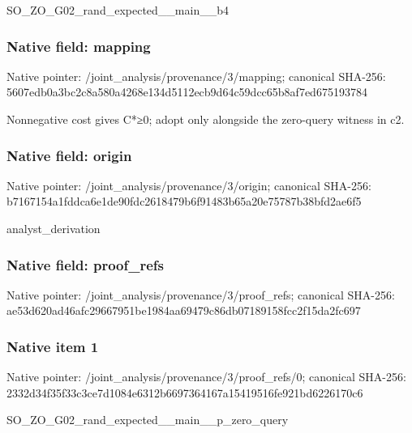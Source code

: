 \documentclass[10pt,a4paper]{article}
\begin{document}
\begingroup\raggedright\sloppy SO\_\allowbreak{}ZO\_\allowbreak{}G02\_\allowbreak{}rand\_\allowbreak{}expected\_\allowbreak{}\_\allowbreak{}main\_\allowbreak{}\_\allowbreak{}b4\par\endgroup

\subsubsection{Native field: mapping}
Native pointer: /joint\_\allowbreak{}analysis/provenance/3/mapping; canonical SHA-256: 5607edb0a3bc2c8a580a4268e134d5112ecb9d64c59dcc65b8af7ed675193784

\begingroup\raggedright\sloppy Nonnegative cost gives C*{\AtlasUnicodeSymbols ≥}\allowbreak{}0;\allowbreak{} adopt only alongside the zero-query witness in c2.\par\endgroup

\subsubsection{Native field: origin}
Native pointer: /joint\_\allowbreak{}analysis/provenance/3/origin; canonical SHA-256: b7167154a1fddca6e1de90fdc2618479b6f91483b65a20e75787b38bfd2ae6f5

\begingroup\raggedright\sloppy analyst\_\allowbreak{}derivation\par\endgroup

\subsubsection{Native field: proof\_\allowbreak{}refs}
Native pointer: /joint\_\allowbreak{}analysis/provenance/3/proof\_\allowbreak{}refs; canonical SHA-256: ae53d620ad46afc29667951be1984aa69479c86db07189158fcc2f15da2fc697

\subsubsection{Native item 1}
Native pointer: /joint\_\allowbreak{}analysis/provenance/3/proof\_\allowbreak{}refs/0; canonical SHA-256: 2332d34f35f33c3ce7d1084e6312b6697364167a15419516fe921bd6226170c6

\begingroup\raggedright\sloppy SO\_\allowbreak{}ZO\_\allowbreak{}G02\_\allowbreak{}rand\_\allowbreak{}expected\_\allowbreak{}\_\allowbreak{}main\_\allowbreak{}\_\allowbreak{}p\_\allowbreak{}zero\_\allowbreak{}query\par\endgroup
\end{document}
